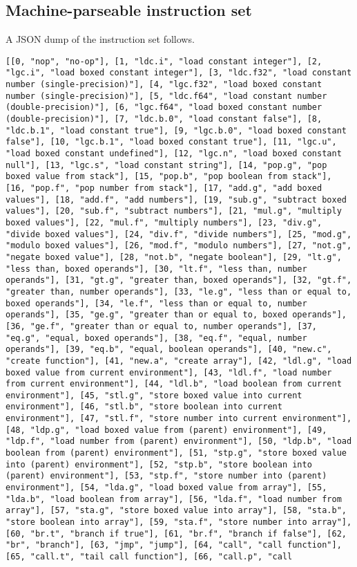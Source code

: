 \subsection{Machine-parseable instruction set}
\label{sec:org5fffbe9}
A JSON dump of the instruction set follows.

\begin{verbatim}
[[0, "nop", "no-op"], [1, "ldc.i", "load constant integer"], [2, "lgc.i", "load boxed constant integer"], [3, "ldc.f32", "load constant number (single-precision)"], [4, "lgc.f32", "load boxed constant number (single-precision)"], [5, "ldc.f64", "load constant number (double-precision)"], [6, "lgc.f64", "load boxed constant number (double-precision)"], [7, "ldc.b.0", "load constant false"], [8, "ldc.b.1", "load constant true"], [9, "lgc.b.0", "load boxed constant false"], [10, "lgc.b.1", "load boxed constant true"], [11, "lgc.u", "load boxed constant undefined"], [12, "lgc.n", "load boxed constant null"], [13, "lgc.s", "load constant string"], [14, "pop.g", "pop boxed value from stack"], [15, "pop.b", "pop boolean from stack"], [16, "pop.f", "pop number from stack"], [17, "add.g", "add boxed values"], [18, "add.f", "add numbers"], [19, "sub.g", "subtract boxed values"], [20, "sub.f", "subtract numbers"], [21, "mul.g", "multiply boxed values"], [22, "mul.f", "multiply numbers"], [23, "div.g", "divide boxed values"], [24, "div.f", "divide numbers"], [25, "mod.g", "modulo boxed values"], [26, "mod.f", "modulo numbers"], [27, "not.g", "negate boxed value"], [28, "not.b", "negate boolean"], [29, "lt.g", "less than, boxed operands"], [30, "lt.f", "less than, number operands"], [31, "gt.g", "greater than, boxed operands"], [32, "gt.f", "greater than, number operands"], [33, "le.g", "less than or equal to, boxed operands"], [34, "le.f", "less than or equal to, number operands"], [35, "ge.g", "greater than or equal to, boxed operands"], [36, "ge.f", "greater than or equal to, number operands"], [37, "eq.g", "equal, boxed operands"], [38, "eq.f", "equal, number operands"], [39, "eq.b", "equal, boolean operands"], [40, "new.c", "create function"], [41, "new.a", "create array"], [42, "ldl.g", "load boxed value from current environment"], [43, "ldl.f", "load number from current environment"], [44, "ldl.b", "load boolean from current environment"], [45, "stl.g", "store boxed value into current environment"], [46, "stl.b", "store boolean into current environment"], [47, "stl.f", "store number into current environment"], [48, "ldp.g", "load boxed value from (parent) environment"], [49, "ldp.f", "load number from (parent) environment"], [50, "ldp.b", "load boolean from (parent) environment"], [51, "stp.g", "store boxed value into (parent) environment"], [52, "stp.b", "store boolean into (parent) environment"], [53, "stp.f", "store number into (parent) environment"], [54, "lda.g", "load boxed value from array"], [55, "lda.b", "load boolean from array"], [56, "lda.f", "load number from array"], [57, "sta.g", "store boxed value into array"], [58, "sta.b", "store boolean into array"], [59, "sta.f", "store number into array"], [60, "br.t", "branch if true"], [61, "br.f", "branch if false"], [62, "br", "branch"], [63, "jmp", "jump"], [64, "call", "call function"], [65, "call.t", "tail call function"], [66, "call.p", "call 
\end{verbatim}
